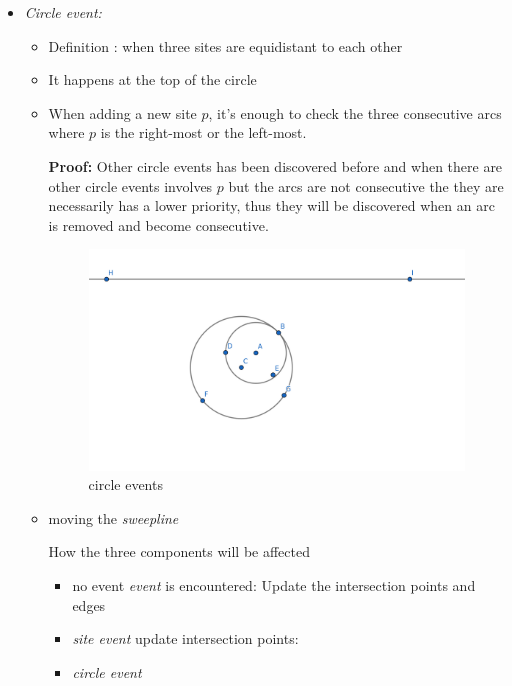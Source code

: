 \documentclass{article}
\begin{document}
\begin{enumerate}
\begin{itemize}
        \item \textit{Circle event:}
            \begin{displayquote}
            \begin{itemize}
                \item Definition : when three sites are equidistant to each other
                \item It happens at the top of the circle 
                \item When adding a new site $p$, it's enough to check the three consecutive arcs  where $p$ is the right-most or the left-most.
                \begin{displayquote}
                {\textbf{Proof:}} Other circle events has been discovered before and when there are other circle events involves $p$ but the arcs are not consecutive the they are necessarily has a lower priority, thus they will be discovered when an arc is removed and become consecutive.
                \begin{figure}[h]
                \centering
                 \includegraphics{circle-event.png}
                    \caption{circle events}
                    \label{fig:my_label}
                \end{figure}
                \end{displayquote}
                
            \item moving the  {\it{sweepline}}  
              \begin{displayquote}
                How the three components will be affected
                \begin{itemize}
                    \item no event {\textit{event}} is encountered:
                    Update the intersection points and edges
                    \item {\textit{site event}} update intersection points:
                    \item {\textit{circle event}} 
                    

\end{itemize}
\end{displayquote}
\end{itemize}
\end{displayquote}
\end{itemize}
\end{enumerate}
\end{document}
